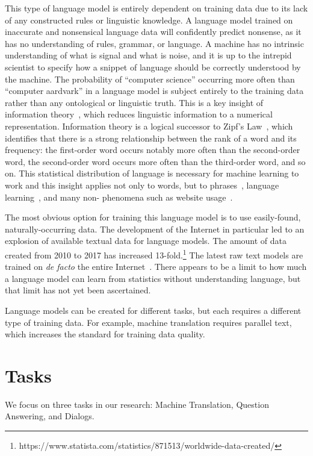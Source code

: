 This type of language model is entirely dependent on training data due to its lack of any constructed rules or linguistic knowledge. 
%
A language model trained on inaccurate and nonsensical language data will confidently predict nonsense, as it has no understanding of rules, grammar, or language.
%
A machine has no intrinsic understanding of what is signal and what is noise, and it is up to the intrepid scientist to specify how a snippet of language should be correctly understood by the machine.
%
The probability of ``computer science'' occurring more often than ``computer aardvark'' in a language model is subject entirely to the training data rather than any ontological or linguistic truth.  
%
This is a key insight of information theory~\citep{shannon1949mathematical}, which reduces linguistic information to a numerical representation.  
%
Information theory is a logical successor to Zipf's Law~\citep{zipf1935psycho}, which  identifies that there is a strong relationship between the rank of a word and its frequency: the first-order word occurs notably more often than the second-order word, the second-order word occurs more often than the third-order word, and so on.   
%  
This statistical distribution of language is necessary for machine learning to work and this insight applies not only to words, but to phrases~\citep{williams2015zipf}, language learning~\citep{powers1998applications}, and many non-\nlp{} phenomena such as website usage~\citep{jiang2013understanding}.  


The most obvious option for training this language model is to use easily-found, naturally-occurring data.  
%
The development of the Internet in particular led to an explosion of available textual data for language models.  
%
The amount of data created from 2010 to 2017 has increased 13-fold.\footnote{https://www.statista.com/statistics/871513/worldwide-data-created/}
%
The latest raw text models are trained on \textit{de facto} the entire Internet~\citep{brown2020language}.  
%
There appears to be a limit to how much a language model can learn from statistics without understanding language, but that limit has not yet been ascertained.    

Language models can be created for different \nlp{} tasks, but each requires a different type of training data.  
%
For example, machine translation requires parallel text, which increases the standard for training data quality.  

\section{Tasks}
\label{sec:bgtasks}
We focus on three \nlp{} tasks in our research: Machine Translation, Question Answering, and Dialogs.


